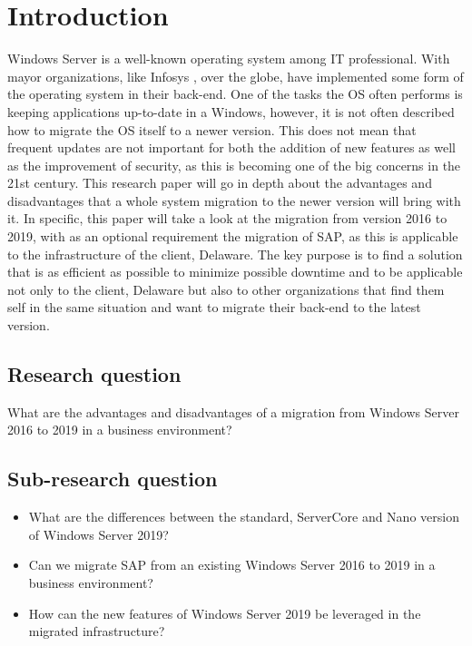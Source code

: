\section{Introduction}\label{sec:introduction}
Windows Server is a well-known operating system among IT professional. With mayor organizations, like Infosys \autocite{S.Chauhan2015}, over the globe, have implemented some form of the operating system in their back-end. One of the tasks the OS often performs is keeping applications up-to-date in a Windows, however, it is not often described how to migrate the OS itself to a newer version. 
This does not mean that frequent updates are not important for both the addition of new features as well as the improvement of security, as this is becoming one of the big concerns in the 21st century. 
This research paper will go in depth about the advantages and disadvantages that a whole system migration to the newer version will bring with it. In specific, this paper will take a look at the migration from version 2016 to 2019, with as an optional requirement the migration of SAP, as this is applicable to the infrastructure of the client, Delaware.
The key purpose is to find a solution that is as efficient as possible to minimize possible downtime and to be applicable not only to the client, Delaware but also to other organizations that find them self in the same situation and want to migrate their back-end to the latest version.
\subsection{Research question}
What are the advantages and disadvantages of a migration from Windows Server 2016 to 2019 in a business environment?
\subsection{Sub-research question}
\begin{itemize}
	\item What are the differences between the standard, ServerCore and Nano version of Windows Server 2019?
	\item Can we migrate SAP from an existing Windows Server 2016 to 2019 in a business environment?
	\item How can the new features of Windows Server 2019 be leveraged in the migrated infrastructure? 
\end{itemize}
